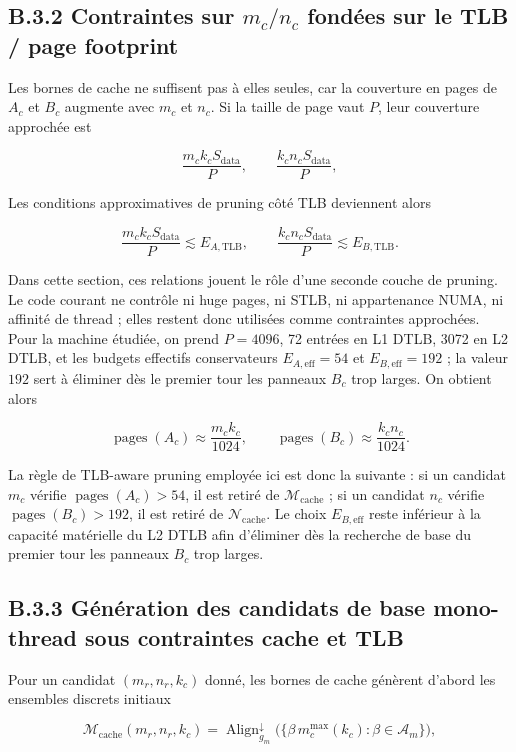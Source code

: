 \documentclass[a4paper,11pt,oneside]{article}
\begin{document}
\subsection*{B.3.2 Contraintes sur $m_c/n_c$ fondées sur le TLB / page footprint}

Les bornes de cache ne suffisent pas à elles seules, car la couverture en pages de $A_c$ et $B_c$ augmente avec $m_c$ et $n_c$. Si la taille de page vaut $P$, leur couverture approchée est

$$
\frac{m_c k_c S_{\text{data}}}{P},
\qquad
\frac{k_c n_c S_{\text{data}}}{P},
$$

Les conditions approximatives de pruning côté TLB deviennent alors

$$
\frac{m_c k_c S_{\text{data}}}{P} \lesssim E_{A,\text{TLB}},
\qquad
\frac{k_c n_c S_{\text{data}}}{P} \lesssim E_{B,\text{TLB}}.
$$

Dans cette section, ces relations jouent le rôle d'une seconde couche de pruning. Le code courant ne contrôle ni huge pages, ni STLB, ni appartenance NUMA, ni affinité de thread ; elles restent donc utilisées comme contraintes approchées. Pour la machine étudiée, on prend $P=4096$, 72 entrées en L1 DTLB, 3072 en L2 DTLB, et les budgets effectifs conservateurs $E_{A,\text{eff}}=54$ et $E_{B,\text{eff}}=192$ ; la valeur $192$ sert à éliminer dès le premier tour les panneaux $B_c$ trop larges. On obtient alors

$$
\operatorname{pages}(A_c) \approx \frac{m_c k_c}{1024},
\qquad
\operatorname{pages}(B_c) \approx \frac{k_c n_c}{1024}.
$$

La règle de TLB-aware pruning employée ici est donc la suivante : si un candidat $m_c$ vérifie $\operatorname{pages}(A_c) > 54$, il est retiré de $\mathcal{M}_{\text{cache}}$ ; si un candidat $n_c$ vérifie $\operatorname{pages}(B_c) > 192$, il est retiré de $\mathcal{N}_{\text{cache}}$. Le choix $E_{B,\text{eff}}$ reste inférieur à la capacité matérielle du L2 DTLB afin d'éliminer dès la recherche de base du premier tour les panneaux $B_c$ trop larges.

\subsection*{B.3.3 Génération des candidats de base mono-thread sous contraintes cache et TLB}

Pour un candidat $(m_r,n_r,k_c)$ donné, les bornes de cache génèrent d'abord les ensembles discrets initiaux

$$
\mathcal{M}_{\text{cache}}(m_r,n_r,k_c)
= \operatorname{Align}^{\downarrow}_{g_m}\bigl(\{\beta\, m_c^{\max}(k_c) : \beta \in \mathcal{A}_m\}\bigr),
$$
\end{document}
